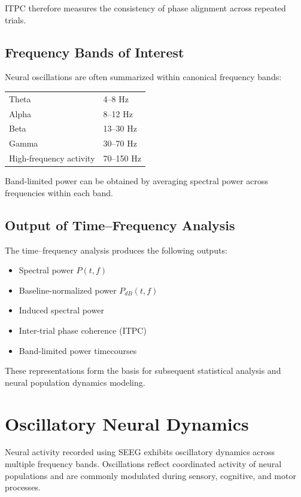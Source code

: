 \documentclass[11pt]{report}
\begin{document}
ITPC therefore measures the consistency of phase alignment
across repeated trials.

\section{Frequency Bands of Interest}

Neural oscillations are often summarized within canonical frequency
bands:

\begin{center}
\begin{tabular}{ll}
Theta & 4--8 Hz \\
Alpha & 8--12 Hz \\
Beta & 13--30 Hz \\
Gamma & 30--70 Hz \\
High-frequency activity & 70--150 Hz
\end{tabular}
\end{center}

Band-limited power can be obtained by averaging spectral power
across frequencies within each band.

\section{Output of Time--Frequency Analysis}

The time--frequency analysis produces the following outputs:

\begin{itemize}
\item Spectral power $P(t,f)$
\item Baseline-normalized power $P_{dB}(t,f)$
\item Induced spectral power
\item Inter-trial phase coherence (ITPC)
\item Band-limited power timecourses
\end{itemize}

These representations form the basis for subsequent statistical
analysis and neural population dynamics modeling.


\chapter{Oscillatory Neural Dynamics}

Neural activity recorded using SEEG exhibits oscillatory dynamics across
multiple frequency bands. Oscillations reflect coordinated activity
of neural populations and are commonly modulated during sensory,
cognitive, and motor processes.
\end{document}
